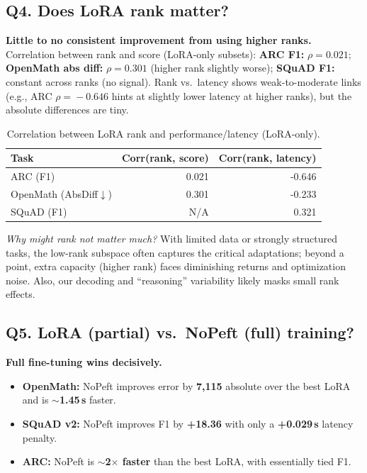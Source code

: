 \documentclass[11pt,a4paper]{article}
\begin{document}
\subsection*{Q4. Does LoRA rank matter?}
\textbf{Little to no consistent improvement from using higher ranks.}
Correlation between rank and score (LoRA-only subsets): \textbf{ARC F1:} $\rho\!=\!0.021$; \textbf{OpenMath abs diff:} $\rho\!=\!0.301$ (higher rank slightly worse); \textbf{SQuAD F1:} constant across ranks (no signal). Rank vs.\ latency shows weak-to-moderate links (e.g., ARC $\rho\!=\!-0.646$ hints at slightly lower latency at higher ranks), but the absolute differences are tiny.
\begin{table}[h!]
\centering
\caption{Correlation between LoRA rank and performance/latency (LoRA-only).}
\label{tab:correlations}
{\small
\begin{tabular}{lrr}
\toprule
Task & Corr(rank, score) & Corr(rank, latency) \\
\midrule
ARC (F1) & 0.021 & -0.646 \\
OpenMath (AbsDiff$\downarrow$) & 0.301 & -0.233 \\
SQuAD (F1) & N/A & 0.321 \\
\bottomrule
\end{tabular}
}
\end{table}

\textit{Why might rank not matter much?} With limited data or strongly structured tasks, the low-rank subspace often captures the critical adaptations; beyond a point, extra capacity (higher rank) faces diminishing returns and optimization noise. Also, our decoding and “reasoning” variability likely masks small rank effects.

\subsection*{Q5. LoRA (partial) vs.\ NoPeft (full) training?}
\textbf{Full fine-tuning wins decisively.}
\begin{itemize}
  \item \textbf{OpenMath:} NoPeft improves error by \textbf{7{,}115} absolute over the best LoRA and is \textbf{$\sim$1.45\,s} faster.
  \item \textbf{SQuAD v2:} NoPeft improves F1 by \textbf{+18.36} with only a \textbf{+0.029\,s} latency penalty.
  \item \textbf{ARC:} NoPeft is \textbf{$\sim$2$\times$ faster} than the best LoRA, with essentially tied F1.
\end{itemize}
\end{document}
